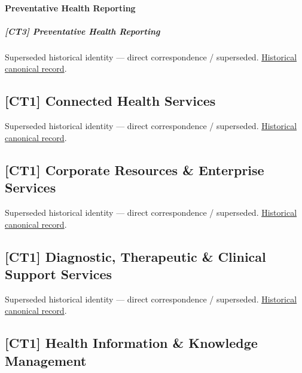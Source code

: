 \paragraph{Preventative Health Reporting}

\subparagraph{[CT3] Preventative Health Reporting}

\par\label{element:4faef45b4ebe4fa69e57c3d81bfea05f}
Superseded historical identity — direct correspondence / superseded. \href{../../../../continuum/strategy/capability/4faef45b4ebe4fa69e57c3d81bfea05f.md}{Historical canonical record}.\par

\subsection{[CT1] Connected Health Services}

\par\label{element:48f01ef8b0e6431c85cf4f40cf8f94c3}
Superseded historical identity — direct correspondence / superseded. \href{../../../../continuum/strategy/capability/48f01ef8b0e6431c85cf4f40cf8f94c3.md}{Historical canonical record}.\par

\subsection{[CT1] Corporate Resources \& Enterprise Services}

\par\label{element:a2dbd74847a44f4c879983229f5c9d08}
Superseded historical identity — direct correspondence / superseded. \href{../../../../continuum/strategy/capability/a2dbd74847a44f4c879983229f5c9d08.md}{Historical canonical record}.\par

\subsection{[CT1] Diagnostic, Therapeutic \& Clinical Support Services}

\par\label{element:e003b9cd0730459a84775d2837d1d173}
Superseded historical identity — direct correspondence / superseded. \href{../../../../continuum/strategy/capability/e003b9cd0730459a84775d2837d1d173.md}{Historical canonical record}.\par

\subsection{[CT1] Health Information \& Knowledge Management}

